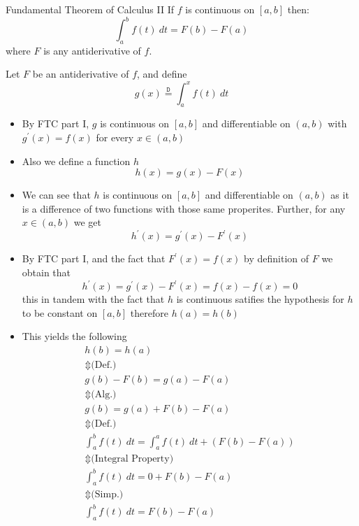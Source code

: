 \documentclass[preview]{standalone}
\begin{document}
\begin{theo*}{Fundamental Theorem of Calculus II}
  If $f$ is continuous on $ \left[ a, b \right]$ then:
  \[
  \int_a ^{b} f\left(t\right)\: dt = F\left(b\right)  -  F\left(a\right)
  \]
  where $F$ is any antiderivative of $f$.
  \begin{pf}
    Let $F$ be an antiderivative of $f$, and define
    \[
    g\left(x\right) \stackrel{\mathtt{D}}{=} \int_{a} ^{x} f\left(t\right)\: dt
    \]
    \begin{itemize}
      \item By FTC part I, $g$ is continuous on $ \left[ a, b \right]$ and differentiable on $ \left( a, b \right)$ with $g ^{\prime}\left(x\right) = f\left(x\right)$ for every $x \in \left( a,b \right)$ 
      \item Also we define a function $h$ 
        \[
        h\left(x\right) = g\left(x\right)  -  F\left(x\right)
        \]
      \item We can see that $h$ is continuous on $ \left[ a, b \right]$ and differentiable on $ \left(  a, b \right)$ as it is a difference of two functions with those same properites. Further, for any $x \in  \left( a, b \right)$ we get
        \[
        h ^{\prime}\left(x\right) = g ^{\prime}\left(x\right)  -  F ^{\prime}\left(x\right)
        \]
      \item By FTC part I, and the fact that $F ^{\prime}\left(x\right) = f\left(x\right)$ by definition of $F$ we obtain that 
        \[
        h ^{\prime}\left(x\right) = g ^{\prime}\left(x\right)  -  F ^{\prime}\left(x\right) = f\left(x\right)  -  f\left(x\right) = 0
        \]
        this in tandem with the fact that $h$ is continuous satifies the hypothesis for $h$ to be constant on $ \left[ a,b \right]$ therefore $h\left(a\right) = h\left(b\right)$ 
      \item This yields the following
        \begin{gather*}
          h\left(b\right) = h\left(a\right) \\
          \Updownarrow \text{(Def.)} \\
          g\left(b\right)  -  F\left(b\right) = g\left(a\right)  -  F\left(a\right)\\
          \Updownarrow \text{(Alg.)} \\
          g\left(b\right)  =    g\left(a\right) + F\left(b\right)  -  F\left(a\right)\\
          \Updownarrow \text{(Def.)} \\
          \int _{a} ^{b} f\left(t\right)\: dt = \int _{a} ^{a} f\left(t\right)\: dt   +  \left( F\left(b\right)  -  F\left(a\right) \right) \\
          \Updownarrow \text{(Integral Property)} \\
          \int _{a} ^{b} f\left(t\right)\: dt = 0  +  F\left(b\right)  -  F\left(a\right) \\
          \Updownarrow \text{(Simp.)} \\
          \int _{a} ^{b} f\left(t\right)\: dt = F\left(b\right)  -  F\left(a\right)
        \end{gather*}
    \end{itemize}
  \end{pf}
\end{theo*}
\end{document}
